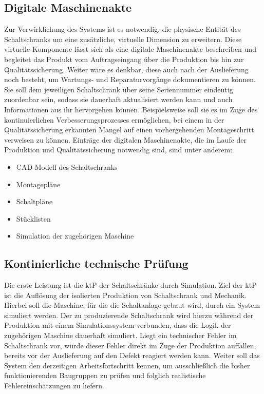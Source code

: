 \documentclass[
    type=Projektarbeit,
    status=draft, %
    language=german, %
    bibengine=bibtex,
]{unibwm-inf-thesis}
\begin{document}
    \subsection{Digitale Maschinenakte}
    Zur Verwirklichung des Systems ist es notwendig, die physische Entität des Schaltschranks um eine zusätzliche,
    virtuelle Dimension zu erweitern.
    Diese virtuelle Komponente lässt sich als eine digitale Maschinenakte beschreiben und begleitet das Produkt vom
    Auftragseingang über die Produktion
    bis hin zur Qualitätssicherung.
    Weiter wäre es denkbar, diese auch nach der Auslieferung noch besteht, um Wartungs- und Reparaturvorgänge
    dokumentieren zu können.
    Sie soll dem jeweiligen Schaltschrank über seine Seriennummer eindeutig zuordenbar sein, sodass sie dauerhaft
    aktualisiert werden kann und auch Informationen aus ihr hervorgehen können.
    Beispielsweise soll sie es im Zuge des kontinuierlichen Verbesserungsprozesses ermöglichen, bei einem in der
    Qualitätssicherung erkannten Mangel auf einen vorhergehenden Montageschritt verweisen zu können.
    Einträge der digitalen Maschinenakte, die im Laufe der Produktion und Qualitätssicherung notwendig sind, sind unter
    anderem:
    \begin{itemize}
        \item CAD-Modell des Schaltschranks
        \item Montagepläne
        \item Schaltpläne
        \item Stücklisten
        \item Simulation der zugehörigen Maschine
    \end{itemize}



    \subsection{Kontinierliche technische Prüfung}
    Die erste Leistung ist die \ac{ktP} der Schaltschränke durch Simulation.
    Ziel der \ac{ktP} ist die Auflösung der isolierten Produktion von Schaltschrank und Mechanik.
    Hierbei soll die Maschine, für die die Schaltanlage gebaut wird, durch ein System simuliert werden.
    Der zu produzierende Schaltschrank wird hierzu während der Produktion mit einem Simulationssystem verbunden, dass die Logik der zugehörigen Maschine dauerhaft simuliert.
    Liegt ein technischer Fehler im Schaltschrank vor, würde dieser Fehler direkt im Zuge der Produktion auffallen, bereits vor der Auslieferung auf den Defekt reagiert werden kann.
    Weiter soll das System den derzeitigen Arbeitsfortschritt kennen, um ausschließlich die bisher funktionierenden Baugruppen zu prüfen und folglich realistische Fehlereinschätzungen zu liefern.
\end{document}
